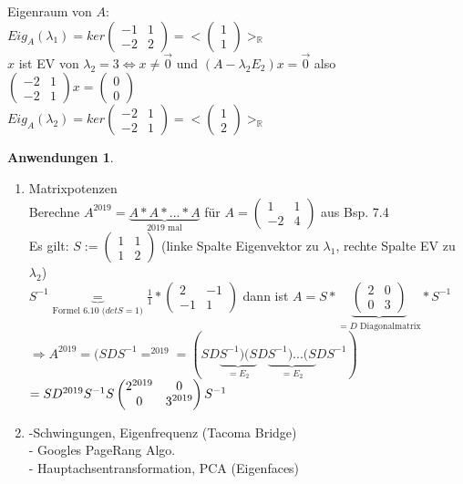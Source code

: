 \documentclass[a4paper,11pt]{article}
\newtheorem{anw}[definition]{Anwendungen}
\begin{document}
\newpage
Eigenraum von $A$: \\
$Eig_A(\lambda_1)=ker\begin{pmatrix}-1&1\\-2&2\end{pmatrix}=<\begin{pmatrix}1\\1\end{pmatrix}>_{\mathbb{R}}$ \\
$x$ ist EV von $\lambda_2=3\Leftrightarrow x\neq\overset{\rightarrow}{0}$ und $(A-\lambda_2E_2)x=\overset{\rightarrow}{0}$ also $\begin{pmatrix}-2&1\\-2&1\end{pmatrix}x=\begin{pmatrix}0\\0\end{pmatrix}$ \\
$Eig_A(\lambda_2)=ker\begin{pmatrix}-2&1\\-2&1\end{pmatrix}=<\begin{pmatrix}1\\2\end{pmatrix}>_{\mathbb{R}}$ 
\begin{anw}
\end{anw}
\begin{enumerate}[label=\alph*)]
\item Matrixpotenzen \\
Berechne $A^{2019}=\underbrace{A*A*...*A}_{\text{2019 mal}}$ für $A=\begin{pmatrix}1&1\\-2&4\end{pmatrix}$ aus Bsp. 7.4 \\
Es gilt: $S:=\begin{pmatrix}1&1\\1&2\end{pmatrix}$ (linke Spalte Eigenvektor zu $\lambda_1$, rechte Spalte EV zu $\lambda_2$) \\
$S^{-1}\underbrace{=}_{\text{Formel 6.10 ($detS=1$)}}\frac{1}{1}*\begin{pmatrix}2&-1\\-1&1\end{pmatrix}$ dann ist $A=S*\underbrace{\begin{pmatrix}2&0\\0&3\end{pmatrix}}_{=D\text{ Diagonalmatrix}}*S^{-1}$ \\
$\Rightarrow A^{2019}=(SDS^{-1}=^{2019}=(SD\underbrace{S^{-1})(S}_{=E_2}D\underbrace{S^{-1})...(S}_{=E_2}DS^{-1})$ \\
$=SD^{2019}S^{-1} \\
S\begin{pmatrix}2^{2019}&0\\0&3^{2019}\end{pmatrix}S^{-1}$
\item -Schwingungen, Eigenfrequenz (Tacoma Bridge) \\
- Googles PageRang Algo. \\
- Hauptachsentransformation, PCA (Eigenfaces)
\end{enumerate}
\end{document}
